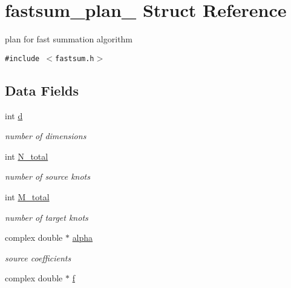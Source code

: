 \hypertarget{structfastsum__plan__}{
\section{fastsum\_\-plan\_\- Struct Reference}
\label{structfastsum__plan__}
}
plan for fast summation algorithm  


{\tt \#include $<$fastsum.h$>$}

\subsection*{Data Fields}
\begin{CompactItemize}
\item 
\hypertarget{structfastsum__plan___o0}{
int \hyperlink{structfastsum__plan___o0}{d}}
\label{structfastsum__plan___o0}

\begin{CompactList}\small\item\em number of dimensions \item\end{CompactList}\item 
\hypertarget{structfastsum__plan___o1}{
int \hyperlink{structfastsum__plan___o1}{N\_\-total}}
\label{structfastsum__plan___o1}

\begin{CompactList}\small\item\em number of source knots \item\end{CompactList}\item 
\hypertarget{structfastsum__plan___o2}{
int \hyperlink{structfastsum__plan___o2}{M\_\-total}}
\label{structfastsum__plan___o2}

\begin{CompactList}\small\item\em number of target knots \item\end{CompactList}\item 
\hypertarget{structfastsum__plan___o3}{
complex double $\ast$ \hyperlink{structfastsum__plan___o3}{alpha}}
\label{structfastsum__plan___o3}

\begin{CompactList}\small\item\em source coefficients \item\end{CompactList}\item 
\hypertarget{structfastsum__plan___o4}{
complex double $\ast$ \hyperlink{structfastsum__plan___o4}{f}}
\label{structfastsum__plan___o4}


\end{CompactItemize}
